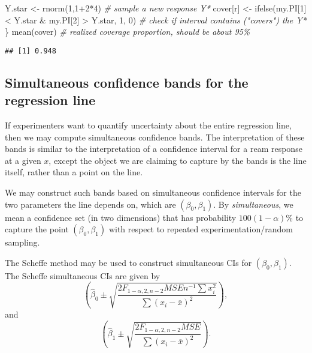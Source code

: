 \documentclass[
]{book}
\newenvironment{Shaded}{\begin{snugshade}}{\end{snugshade}}
\newcommand{\CommentTok}[1]{\textcolor[rgb]{0.56,0.35,0.01}{\textit{#1}}}
\newcommand{\DecValTok}[1]{\textcolor[rgb]{0.00,0.00,0.81}{#1}}
\newcommand{\FunctionTok}[1]{\textcolor[rgb]{0.00,0.00,0.00}{#1}}
\newcommand{\NormalTok}[1]{#1}
\newcommand{\OtherTok}[1]{\textcolor[rgb]{0.56,0.35,0.01}{#1}}
\newcommand{\SpecialCharTok}[1]{\textcolor[rgb]{0.00,0.00,0.00}{#1}}
\begin{document}
\begin{Shaded}
\begin{Highlighting}[]
\NormalTok{Y.star }\OtherTok{\textless{}{-}} \FunctionTok{rnorm}\NormalTok{(}\DecValTok{1}\NormalTok{,}\DecValTok{1}\SpecialCharTok{+}\DecValTok{2}\SpecialCharTok{*}\DecValTok{4}\NormalTok{) }\CommentTok{\# sample a new response Y*}
\NormalTok{cover[r] }\OtherTok{\textless{}{-}} \FunctionTok{ifelse}\NormalTok{(my.PI[}\DecValTok{1}\NormalTok{] }\SpecialCharTok{\textless{}}\NormalTok{ Y.star }\SpecialCharTok{\&}\NormalTok{ my.PI[}\DecValTok{2}\NormalTok{] }\SpecialCharTok{\textgreater{}}\NormalTok{ Y.star, }\DecValTok{1}\NormalTok{, }\DecValTok{0}\NormalTok{) }\CommentTok{\# check if interval contains ("covers") the Y*}
\NormalTok{\}}
\FunctionTok{mean}\NormalTok{(cover)  }\CommentTok{\# realized coverage proportion, should be about 95\%}
\end{Highlighting}
\end{Shaded}

\begin{verbatim}
## [1] 0.948
\end{verbatim}

\hypertarget{simultaneous-confidence-bands-for-the-regression-line}{%
\subsection{Simultaneous confidence bands for the regression line}\label{simultaneous-confidence-bands-for-the-regression-line}}

If experimenters want to quantify uncertainty about the entire regression line, then we may compute simultaneous confidence bands. The interpretation of these bands is similar to the interpretation of a confidence interval for a ream response at a given \(x\), except the object we are claiming to capture by the bands is the line itself, rather than a point on the line.

We may construct such bands based on simultaneous confidence intervals for the two parameters the line depends on, which are \((\beta_0, \beta_1)\). By \emph{simultaneous}, we mean a confidence set (in two dimensions) that has probability \(100(1-\alpha)\%\) to capture the point \((\beta_0, \beta_1)\) with respect to repeated experimentation/random sampling.

The Scheffe method may be used to construct simultaneous CIs for \((\beta_0, \beta_1)\). The Scheffe simultaneous CIs are given by
\[\left(\hat\beta_0 \pm \sqrt{\frac{2F_{1-\alpha, 2, n-2}MSE n^{-1}\sum x_i^2}{\sum(x_i - \overline x)^2}}\right),\]
and
\[\left(\hat\beta_1 \pm \sqrt{\frac{2F_{1-\alpha, 2, n-2}MSE }{\sum(x_i - \overline x)^2}}\right).\]
\end{document}
